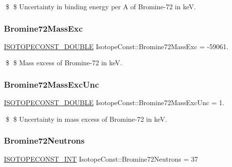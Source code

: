 \$ \$ Uncertainty in binding energy per A of Bromine-\/72 in keV. \mbox{\label{group___isotope_const-_bromine-_br72_gab877fe3005f93a145760225d2d37554b}} 
\subsubsection{\texorpdfstring{Bromine72\+Mass\+Exc}{Bromine72MassExc}}
{\footnotesize\ttfamily \mbox{\hyperlink{group___isotope_const-_macros_ga8f45a7272ce02c0b4c65c44636ed719a}{I\+S\+O\+T\+O\+P\+E\+C\+O\+N\+S\+T\+\_\+\+D\+O\+U\+B\+LE}} Isotope\+Const\+::\+Bromine72\+Mass\+Exc = -\/59061.}

\$ \$ Mass excess of Bromine-\/72 in keV. \mbox{\label{group___isotope_const-_bromine-_br72_gab58a8475458b4f98dd11c4502ed4babe}} 
\subsubsection{\texorpdfstring{Bromine72\+Mass\+Exc\+Unc}{Bromine72MassExcUnc}}
{\footnotesize\ttfamily \mbox{\hyperlink{group___isotope_const-_macros_ga8f45a7272ce02c0b4c65c44636ed719a}{I\+S\+O\+T\+O\+P\+E\+C\+O\+N\+S\+T\+\_\+\+D\+O\+U\+B\+LE}} Isotope\+Const\+::\+Bromine72\+Mass\+Exc\+Unc = 1.}

\$ \$ Uncertainty in mass excess of Bromine-\/72 in keV. \mbox{\label{group___isotope_const-_bromine-_br72_ga1325f68c10684b2012f23258f4c591f7}} 
\subsubsection{\texorpdfstring{Bromine72\+Neutrons}{Bromine72Neutrons}}
{\footnotesize\ttfamily \mbox{\hyperlink{group___isotope_const-_macros_ga5f18360b3e99483a35c32d789e62621c}{I\+S\+O\+T\+O\+P\+E\+C\+O\+N\+S\+T\+\_\+\+I\+NT}} Isotope\+Const\+::\+Bromine72\+Neutrons = 37}

